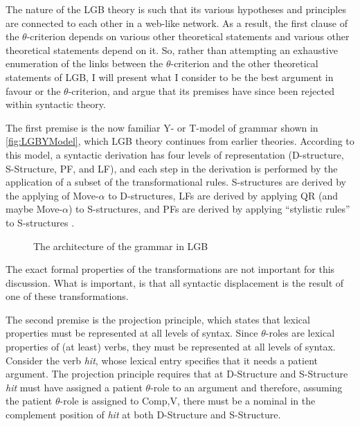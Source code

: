 \documentclass[MilwayThesis]{subfiles}
\begin{document}
The nature of the LGB theory is such that its various hypotheses and principles are connected to each other in a web-like network.
As a result, the first clause of the $\theta$-criterion depends on various other theoretical statements and various other theoretical statements depend on it.
So, rather than attempting an exhaustive enumeration of the links between the $\theta$-criterion and the other theoretical statements of LGB, I will present what I consider to be the best argument in favour or the $\theta$-criterion, and argue that its premises have since been rejected within syntactic theory.

The first premise is the now familiar Y- or T-model of grammar shown in \autoref{fig:LGBYModel}, which LGB theory continues from earlier theories.
According to this model, a syntactic derivation has four levels of representation (D-structure, S-Structure, PF, and LF), and each step in the derivation is performed by the application of a subset of the transformational rules.
S-structures are derived by the applying of Move-$\alpha$ to D-structures, LFs are derived by applying QR (and maybe Move-$\alpha$) to S-structures, and PFs are derived by applying ``stylistic rules'' to S-structures \parencite[18]{chomsky1981lectures}.
\begin{figure}[h]
	\centering
{}
	\caption{The architecture of the grammar in LGB}
	\label{fig:LGBYModel}
\end{figure}
The exact formal properties of the transformations are not important for this discussion.
What is important, is that all syntactic displacement is the result of one of these transformations.

The second premise is the projection principle, which states that lexical properties must be represented at all levels of syntax.
Since $\theta$-roles are lexical properties of (at least) verbs, they must be represented at all levels of syntax.
Consider the verb \textit{hit}, whose lexical entry specifies that it needs a patient argument.
The projection principle requires that at D-Structure and S-Structure \textit{hit} must have assigned a patient $\theta$-role to an argument and therefore, assuming the patient $\theta$-role is assigned to Comp,V, there must be a nominal in the complement position of \textit{hit} at both D-Structure and S-Structure.
\end{document}
